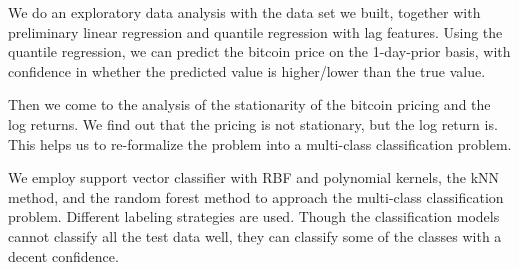 \documentclass[9pt,twocolumn,twoside]{ilcss}
\begin{document}
We do an exploratory data analysis with the data set we built, together with preliminary linear regression and quantile regression with lag features. Using the quantile regression, we can predict the bitcoin price on the 1-day-prior basis, with confidence in whether the predicted value is higher/lower than the true value. 

Then we come to the analysis of the stationarity of the bitcoin pricing and the log returns. We find out that the pricing is not stationary, but the log return is. This helps us to re-formalize the problem into a multi-class classification problem. 

We employ support vector classifier with RBF and polynomial kernels, the kNN method, and the random forest method to approach the multi-class classification problem. Different labeling strategies are used. Though the classification models cannot classify all the test data well, they can classify some of the classes with a decent confidence.



\end{document}
